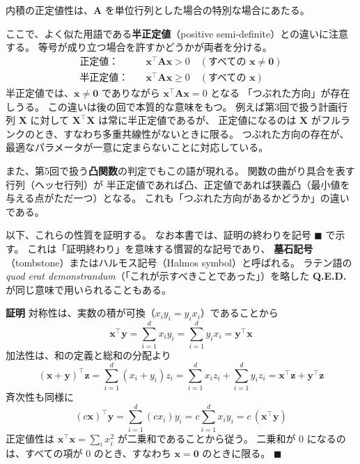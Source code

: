 内積の正定値性は、$\bm{A}$ を単位行列とした場合の特別な場合にあたる。

ここで、よく似た用語である\textbf{半正定値}（positive semi-definite）との違いに注意する。
等号が成り立つ場合を許すかどうかが両者を分ける。
\begin{align}
  \text{正定値：} \quad & \bm{x}^\top \bm{A}\bm{x} > 0 \quad (\text{すべての } \bm{x} \neq \bm{0}) \\
  \text{半正定値：} \quad & \bm{x}^\top \bm{A}\bm{x} \geq 0 \quad (\text{すべての } \bm{x})
\end{align}
半正定値では、$\bm{x} \neq \bm{0}$ でありながら $\bm{x}^\top \bm{A}\bm{x} = 0$ となる
「つぶれた方向」が存在しうる。
この違いは後の回で本質的な意味をもつ。
例えば第3回で扱う計画行列 $\bm{X}$ に対して $\bm{X}^\top \bm{X}$ は常に半正定値であるが、
正定値になるのは $\bm{X}$ がフルランクのとき、すなわち多重共線性がないときに限る。
つぶれた方向の存在が、最適なパラメータが一意に定まらないことに対応している。

また、第5回で扱う\textbf{凸関数}の判定でもこの語が現れる。
関数の曲がり具合を表す行列（ヘッセ行列）が
半正定値であれば凸、正定値であれば狭義凸（最小値を与える点がただ一つ）となる。
これも「つぶれた方向があるかどうか」の違いである。

以下、これらの性質を証明する。
なお本書では、証明の終わりを記号 $\blacksquare$ で示す。
これは「証明終わり」を意味する慣習的な記号であり、
\textbf{墓石記号}（tombstone）またはハルモス記号（Halmos symbol）と呼ばれる。
ラテン語の \textit{quod erat demonstrandum}（「これが示すべきことであった」）を略した
\textbf{Q.E.D.} が同じ意味で用いられることもある。

\noindent
\textbf{証明}\quad
対称性は、実数の積が可換（$x_i y_i = y_i x_i$）であることから
\begin{equation}
  \bm{x}^\top \bm{y} = \sum_{i=1}^{d} x_i y_i = \sum_{i=1}^{d} y_i x_i = \bm{y}^\top \bm{x}
\end{equation}
加法性は、和の定義と総和の分配より
\begin{equation}
  (\bm{x} + \bm{y})^\top \bm{z} = \sum_{i=1}^{d} (x_i + y_i) z_i
  = \sum_{i=1}^{d} x_i z_i + \sum_{i=1}^{d} y_i z_i
  = \bm{x}^\top \bm{z} + \bm{y}^\top \bm{z}
\end{equation}
斉次性も同様に
\begin{equation}
  (c\bm{x})^\top \bm{y} = \sum_{i=1}^{d} (c x_i) y_i = c \sum_{i=1}^{d} x_i y_i = c\,(\bm{x}^\top \bm{y})
\end{equation}
正定値性は $\bm{x}^\top \bm{x} = \sum_i x_i^2$ が二乗和であることから従う。
二乗和が $0$ になるのは、すべての項が $0$ のとき、すなわち $\bm{x} = \bm{0}$ のときに限る。
\hfill $\blacksquare$

